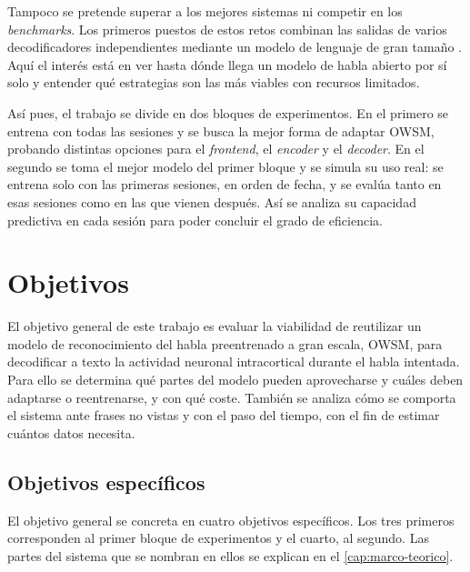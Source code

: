 Tampoco se pretende superar a los mejores sistemas ni competir en los \textit{benchmarks}. Los primeros puestos de estos retos combinan las salidas de varios decodificadores independientes mediante un modelo de lenguaje de gran tamaño \cite{b2t24lessons}. Aquí el interés está en ver hasta dónde llega un modelo de habla abierto por sí solo y entender qué estrategias son las más viables con recursos limitados.

Así pues, el trabajo se divide en dos bloques de experimentos. En el primero se entrena con todas las sesiones y se busca la mejor forma de adaptar OWSM, probando distintas opciones para el \textit{frontend}, el \textit{encoder} y el \textit{decoder}. En el segundo se toma el mejor modelo del primer bloque y se simula su uso real: se entrena solo con las primeras sesiones, en orden de fecha, y se evalúa tanto en esas sesiones como en las que vienen después. Así se analiza su capacidad predictiva en cada sesión para poder concluir el grado de eficiencia.

\section{Objetivos}
\label{sec:objetivos}

El objetivo general de este trabajo es evaluar la viabilidad de reutilizar un modelo de reconocimiento del habla preentrenado a gran escala, OWSM, para decodificar a texto la actividad neuronal intracortical durante el habla intentada. Para ello se determina qué partes del modelo pueden aprovecharse y cuáles deben adaptarse o reentrenarse, y con qué coste. También se analiza cómo se comporta el sistema ante frases no vistas y con el paso del tiempo, con el fin de estimar cuántos datos necesita.

\subsection{Objetivos específicos}
\label{sec:objetivos-especificos}

El objetivo general se concreta en cuatro objetivos específicos. Los tres primeros corresponden al primer bloque de experimentos y el cuarto, al segundo. Las partes del sistema que se nombran en ellos se explican en el \cref{cap:marco-teorico}.

